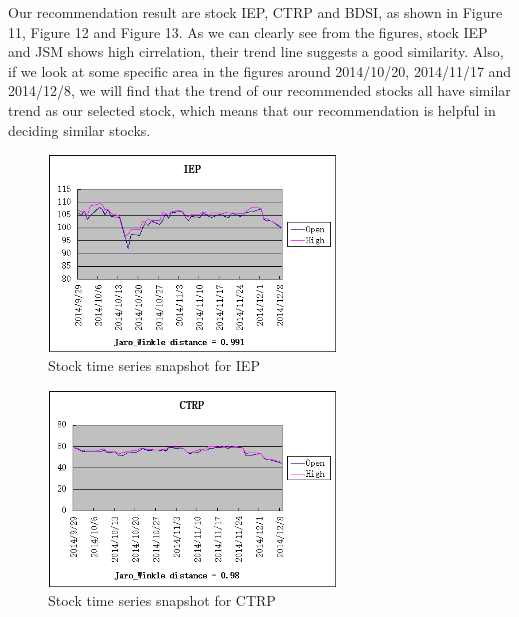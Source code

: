 \documentclass[10pt, conference, compsocconf]{IEEEtran}
\begin{document}
\vspace{1mm}
\par
Our recommendation result are stock IEP, CTRP and BDSI, as shown in Figure 11, Figure 12 and Figure 13. As we can clearly see from the figures, stock IEP and JSM shows high cirrelation, their trend line suggests a good similarity. Also, if we look at some specific area in the figures around 2014/10/20, 2014/11/17 and 2014/12/8, we will find that the trend of our recommended stocks all have similar trend as our selected stock, which means that our recommendation is helpful in deciding similar stocks.\\
\par
\vspace{2mm}
 \begin{figure}[!h]
\includegraphics[width=3in]{figures/IEP}
\caption{Stock time series snapshot for IEP}
\vspace{1mm}
\end{figure}
\par

\par
\vspace{2mm}
 \begin{figure}[!h]
\includegraphics[width=3in]{figures/CTRP}
\caption{Stock time series snapshot for CTRP}
\vspace{1mm}
\end{figure}
\par
\end{document}
